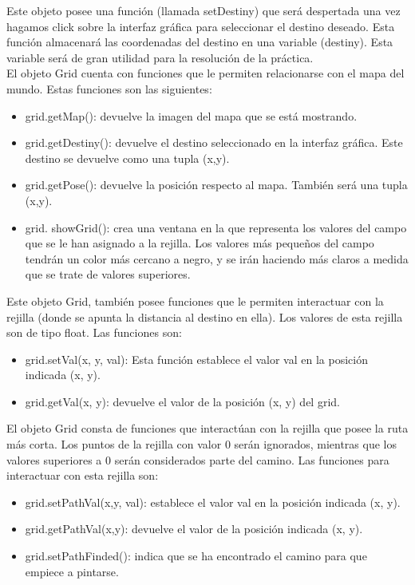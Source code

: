 Este objeto posee una función (llamada setDestiny) que será despertada una vez hagamos click sobre la interfaz gráfica para seleccionar el destino deseado. Esta función almacenará las coordenadas del destino en una variable (destiny). Esta variable será de gran utilidad para la resolución de la práctica.\\

El objeto Grid cuenta con funciones que le permiten relacionarse con el mapa del mundo. Estas funciones son las siguientes:

\begin{itemize}
\item grid.getMap(): devuelve la imagen del mapa que se está mostrando.
\item grid.getDestiny(): devuelve el destino seleccionado en la interfaz gráfica. Este destino se devuelve como una tupla (x,y).
\item	grid.getPose(): devuelve la posición respecto al mapa. También será una tupla (x,y).
\item	grid. showGrid(): crea una ventana en la que representa los valores del campo que se le han asignado a la rejilla. Los valores más pequeños del campo tendrán un color más cercano a negro, y se irán haciendo más claros a medida que se trate de valores superiores. 
 
\end{itemize}

Este objeto Grid, también posee funciones que le permiten interactuar con la rejilla (donde se apunta la distancia al destino en ella). Los valores de esta rejilla son de tipo float.  Las funciones son:

\begin{itemize}
\item	grid.setVal(x, y, val): Esta función establece el valor val en la posición indicada (x, y).
\item	grid.getVal(x, y): devuelve el valor de la posición (x, y) del grid.
\end{itemize}

El objeto Grid consta de funciones que interactúan con la rejilla que posee la ruta más corta. Los puntos de la rejilla con valor 0 serán ignorados, mientras que los valores superiores a 0 serán considerados parte del camino. Las funciones para interactuar con esta rejilla son:

\begin{itemize}
\item grid.setPathVal(x,y, val): establece el valor val en la posición indicada (x, y).
\item	grid.getPathVal(x,y): devuelve el valor de la posición indicada (x, y).
\item grid.setPathFinded(): indica que se ha encontrado el camino para que empiece a pintarse.
\end{itemize}

